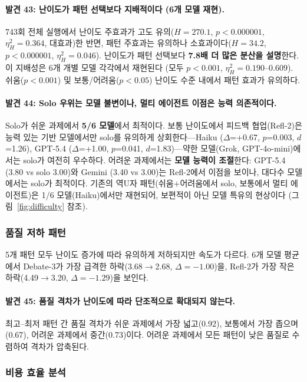 \documentclass[a4paper,11pt]{article}
\begin{document}
\paragraph{발견 43: 난이도가 패턴 선택보다 지배적이다 (6개 모델 재현).}
743회 전체 실행에서 난이도 주효과가 고도 유의($H=270.1$, $p<0.000001$, $\eta^{2}_{H}=0.364$, 대효과)한 반면, 패턴 주효과는 유의하나 소효과이다($H=34.2$, $p<0.000001$, $\eta^{2}_{H}=0.046$). 난이도가 패턴 선택보다 \textbf{7.8배 더 많은 분산을 설명}한다. 이 지배성은 6개 개별 모델 각각에서 재현된다 (모두 $p<0.001$, $\eta^{2}_{H}=0.190$--$0.609$). 쉬움($p<0.001$) 및 보통/어려움($p<0.05$) 난이도 수준 내에서 패턴 효과가 유의하다.

\paragraph{발견 44: Solo 우위는 모델 불변이나, 멀티 에이전트 이점은 능력 의존적이다.}
Solo가 쉬운 과제에서 \textbf{5/6 모델}에서 최적이다. 보통 난이도에서 피드백 협업(Refl-2)은 능력 있는 기반 모델에서만 solo를 유의하게 상회한다---Haiku ($\Delta$=+0.67, $p$=0.003, $d$=1.26), GPT-5.4 ($\Delta$=+1.00, $p$=0.041, $d$=1.83)---약한 모델(Grok, GPT-4o-mini)에서는 solo가 여전히 우수하다. 어려운 과제에서는 \textbf{모델 능력이 조절}한다: GPT-5.4 (3.80 vs solo 3.00)와 Gemini (3.40 vs 3.00)는 Refl-2에서 이점을 보이나, 대다수 모델에서는 solo가 최적이다. 기존의 역U자 패턴(쉬움+어려움에서 solo, 보통에서 멀티 에이전트)은 1/6 모델(Haiku)에서만 재현되어, 보편적이 아닌 모델 특유의 현상이다 (그림~\ref{fig:difficulty} 참조).

\subsubsection{품질 저하 패턴}

5개 패턴 모두 난이도 증가에 따라 유의하게 저하되지만 속도가 다르다. 6개 모델 평균에서 Debate-3가 가장 급격한 하락(3.68$\to$2.68, $\Delta=-1.00$)을, Refl-2가 가장 작은 하락(4.49$\to$3.20, $\Delta=-1.29$)을 보인다.

\paragraph{발견 45: 품질 격차가 난이도에 따라 단조적으로 확대되지 않는다.}
최고--최저 패턴 간 품질 격차가 쉬운 과제에서 가장 넓고(0.92), 보통에서 가장 좁으며(0.67), 어려운 과제에서 중간(0.73)이다. 어려운 과제에서 모든 패턴이 낮은 품질로 수렴하여 격차가 압축된다.

\subsubsection{비용 효율 분석}
\end{document}
